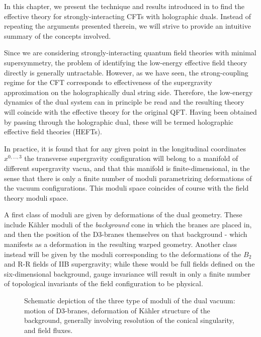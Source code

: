 \label{chap:heft}In this chapter, we present the technique and results introduced in \cite{MZ} to find the effective theory for strongly-interacting CFTs with holographic duals. Instead of repeating the arguments presented therein, we will strive to provide an intuitive summary of the concepts involved.

Since we are considering strongly-interacting quantum field theories with minimal supersymmetry, the problem of identifying the low-energy effective field theory directly is generally untractable. However, as we have seen, the strong-coupling regime for the CFT corresponds to effectiveness of the supergravity approximation on the holographically dual string side. Therefore, the low-energy dynamics of the dual system can in principle be read and the resulting theory will coincide with the effective theory for the original QFT. Having been obtained by passing through the holographic dual, these will be termed holographic effective field theories (HEFTs).

In practice, it is found that for any given point in the longitudinal coordinates $x^{0,\ldots,3}$ the transverse supergravity configuration will belong to a manifold of different supergravity vacua, and that this manifold is finite-dimensional, in the sense that there is only a finite number of moduli parametrizing deformations of the vacuum configurations. This moduli space coincides of course with the field theory moduli space.

A first class of moduli are given by deformations of the dual geometry. These include K\"ahler moduli of the \emph{background} cone in which the branes are placed in, and then the position of the D3-branes themselves on that background - which manifests as a deformation in the resulting warped geometry. Another class instead will be given by the moduli corresponding to the deformations of the $B_2$ and R-R fields of IIB supergravity; while these would be full fields defined on the six-dimensional background, gauge invariance will result in only a finite number of topological invariants of the field configuration to be physical.\\


\begin{figure}
\centering
\def\svgwidth{200pt}
\captionsetup{width=0.8\textwidth}

\caption{Schematic depiction of the three type of moduli of the dual vacuum: motion of D3-branes, deformation of K\"ahler structure of the background, generally involving resolution of the conical singularity, and field fluxes.}
\end{figure}


